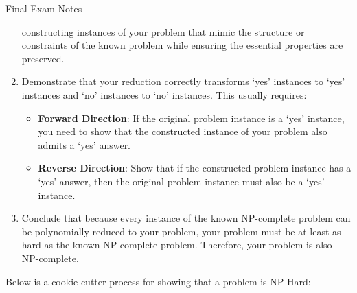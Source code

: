 \begin{examnotes}{Final Exam Notes}
\begin{highlight}
\begin{enumerate}
            constructing instances of your problem that mimic the structure or constraints of the known problem while ensuring the essential properties are preserved.
            \item Demonstrate that your reduction correctly transforms `yes' instances to `yes' instances and `no' instances to `no' instances. This usually requires:
            \begin{itemize}
                \item \textbf{Forward Direction}: If the original problem instance is a `yes' instance, you need to show that the constructed instance of your problem also admits a `yes' answer.
                \item \textbf{Reverse Direction}: Show that if the constructed problem instance has a `yes' answer, then the original problem instance must also be a `yes' instance.
            \end{itemize}
            \item Conclude that because every instance of the known NP-complete problem can be polynomially reduced to your problem, your problem must be at least as hard as the known NP-complete 
            problem. Therefore, your problem is also NP-complete.
        \end{enumerate}
    \end{highlight}

    \begin{highlight}
        Below is a cookie cutter process for showing that a problem is NP Hard:


\end{highlight}
\end{examnotes}
